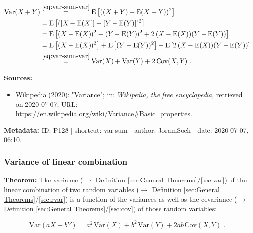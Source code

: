 \documentclass[a4paper,12pt,twoside]{book}
\begin{document}
\begin{equation} \label{eq:var-sum-var-sum-qed}
\begin{split}
\mathrm{Var}(X+Y) &\overset{\eqref{eq:var-sum-var}}{=} \mathrm{E}\left[ ((X+Y)-\mathrm{E}(X+Y))^2 \right] \\
&= \mathrm{E}\left[ ([X-\mathrm{E}(X)] + [Y-\mathrm{E}(Y)])^2 \right] \\
&= \mathrm{E}\left[ (X-\mathrm{E}(X))^2 + (Y-\mathrm{E}(Y))^2 + 2 \, (X-\mathrm{E}(X)) (Y-\mathrm{E}(Y)) \right] \\
&= \mathrm{E}\left[ (X-\mathrm{E}(X))^2 \right] + \mathrm{E}\left[ (Y-\mathrm{E}(Y))^2 \right] + \mathrm{E}\left[ 2 \, (X-\mathrm{E}(X)) (Y-\mathrm{E}(Y)) \right] \\
&\overset{\eqref{eq:var-sum-var}}{=} \mathrm{Var}(X) + \mathrm{Var}(Y) + 2 \, \mathrm{Cov}(X,Y) \; . \\
\end{split}
\end{equation}


\vspace{1em}
\textbf{Sources:}
\begin{itemize}
\item Wikipedia (2020): "Variance"; in: \textit{Wikipedia, the free encyclopedia}, retrieved on 2020-07-07; URL: \url{https://en.wikipedia.org/wiki/Variance#Basic_properties}.
\end{itemize}


\vspace{1em}
\textbf{Metadata:} ID: P128 | shortcut: var-sum | author: JoramSoch | date: 2020-07-07, 06:10.
\vspace{1em}



\subsubsection[\textbf{Variance of linear combination}]{Variance of linear combination} \label{sec:var-lincomb}
\setcounter{equation}{0}

\textbf{Theorem:} The variance ($\rightarrow$ Definition \ref{sec:General Theorems}/\ref{sec:var}) of the linear combination of two random variables ($\rightarrow$ Definition \ref{sec:General Theorems}/\ref{sec:rvar}) is a function of the variances as well as the covariance ($\rightarrow$ Definition \ref{sec:General Theorems}/\ref{sec:cov}) of those random variables:

\begin{equation} \label{eq:var-lincomb-var-lincomb}
\mathrm{Var}(aX+bY) = a^2 \, \mathrm{Var}(X) + b^2 \, \mathrm{Var}(Y) + 2ab \, \mathrm{Cov}(X,Y) \; .
\end{equation}
\end{document}
